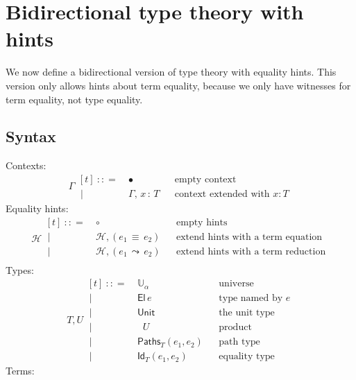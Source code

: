 \documentclass{article}
\newcommand{\G}{\Gamma} %
\newcommand{\T}{T} %
\newcommand{\U}{U} %
\newcommand{\x}{x} %
\newcommand{\e}{e} %
\newcommand{\bnf}{\ \mathrel{{:}{:}{=}}\ }
\newcommand{\bnfor}{\ \mid\ \ }
\newcommand{\ctxempty}{\bullet} %
\newcommand{\ctxextend}[3]{#1,\, #2\, {:}\, #3} %
\newcommand{\Universe}[1]{\mathbb{U}_{#1}} %
\newcommand{\El}[1]{\mathsf{El}\, #1} %
\newcommand{\Unit}{\mathsf{Unit}} %
\newcommand{\Prod}[2]{\mathop{\textstyle\prod_{(#1 {:} #2)}}} %
\newcommand{\PrEqual}[3]{\mathsf{Paths}_{#1}(#2,#3)} %
\newcommand{\JuEqual}[3]{\mathsf{Id}_{#1}(#2,#3)} %
\newcommand{\eqtermhint}[2]{(#1 \,{\equiv}\, #2)} %
\newcommand{\redtermhint}[2]{(#1 \,{\leadsto}\, #2)} %
\renewcommand{\H}{\mathcal{H}}      %
\newcommand{\hintempty}{\circ}      %
\newcommand{\addhinteq}[3]{#1, \eqtermhint{#2}{#3}} %
\newcommand{\addhintred}[3]{#1, \redtermhint{#2}{#3}} %
\begin{document}
\section{Bidirectional type theory with hints}
\label{sec:bidir-type-theory}

We now define a bidirectional version of type theory with equality hints. This version
only allows hints about term equality, because we only have witnesses for term equality,
not type equality.

\subsection{Syntax}
\label{sec:syntax-bidirectional}

Contexts:
%
\begin{equation*}
  \G
  \begin{aligned}[t]
    \bnf   {}& \ctxempty & & \text{empty context}\\
    \bnfor {}& \ctxextend{\G}{\x}{\T} & & \text{context extended with $x : T$}
  \end{aligned}
\end{equation*}
%
Equality hints:
%
\begin{equation*}
  \H
  \begin{aligned}[t]
    \bnf   {}& \hintempty & & \text{empty hints}\\
    \bnfor {}& \addhinteq{\H}{\e_1}{\e_2} & & \text{extend hints with a term equation} \\
    \bnfor {}& \addhintred{\H}{\e_1}{\e_2} & & \text{extend hints with a term reduction} \\
  \end{aligned}
\end{equation*}
%
Types:
%
\begin{equation*}
  \T, \U
  \begin{aligned}[t]
    \bnf   {}& \Universe{\alpha} & & \text{universe}\\
    \bnfor {}& \El{\e} & & \text{type named by $e$}\\
    \bnfor {}& \Unit & & \text{the unit type}\\
    \bnfor {}& \Prod{x}{\T} \U & & \text{product}\\
    \bnfor {}& \PrEqual{T}{\e_1}{\e_2} & & \text{path type}\\
    \bnfor {}& \JuEqual{T}{\e_1}{\e_2} & & \text{equality type}
  \end{aligned}
\end{equation*}
%
Terms:
%
\end{document}
